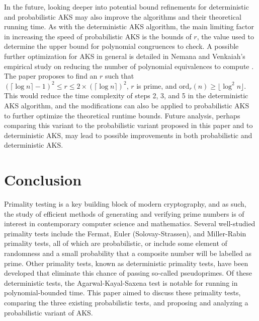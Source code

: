 \documentclass{article}
\begin{document}
In the future, looking deeper into potential bound refinements for deterministic and probabilistic AKS may also improve the algorithms and their theoretical running time. As with the deterministic AKS algorithm, the main limiting factor in increasing the speed of probabilistic AKS is the bounds of $r$, the value used to determine the upper bound for polynomial congruences to check. A possible further optimization for AKS in general is detailed in Nemana and Venkaiah's empirical study on reducing the number of polynomial equivalences to compute \cite{nemana_empirical_2016}. The paper proposes to find an $r$ such that $(\lceil \log{n} \rceil - 1)^2 \leq r \leq 2 \times (\lceil \log{n} \rceil)^2$, $r$ is prime, and $\textrm{ord}_r(n) \geq \lfloor \log^2{n} \rfloor$. This would reduce the time complexity of steps 2, 3, and 5 in the deterministic AKS algorithm, and the modifications can also be applied to probabilistic AKS to further optimize the theoretical runtime bounds. Future analysis, perhaps comparing this variant to the probabilistic variant proposed in this paper and to deterministic AKS, may lead to possible improvements in both probabilistic and deterministic AKS.

\section{Conclusion}
Primality testing is a key building block of modern cryptography, and as such, the study of efficient methods of generating and verifying prime numbers is of interest in contemporary computer science and mathematics. Several well-studied primality tests include the Fermat, Euler (Solovay-Strassen), and Miller-Rabin primality tests, all of which are probabilistic, or include some element of randomness and a small probability that a composite number will be labelled as prime. Other primality tests, known as deterministic primality tests, have been developed that eliminate this chance of passing so-called pseudoprimes. Of these deterministic tests, the Agarwal-Kayal-Saxena test is notable for running in polynomial-bounded time. This paper aimed to discuss these primality tests, comparing the three existing probabilistic tests, and proposing and analyzing a probabilistic variant of AKS.
\end{document}
